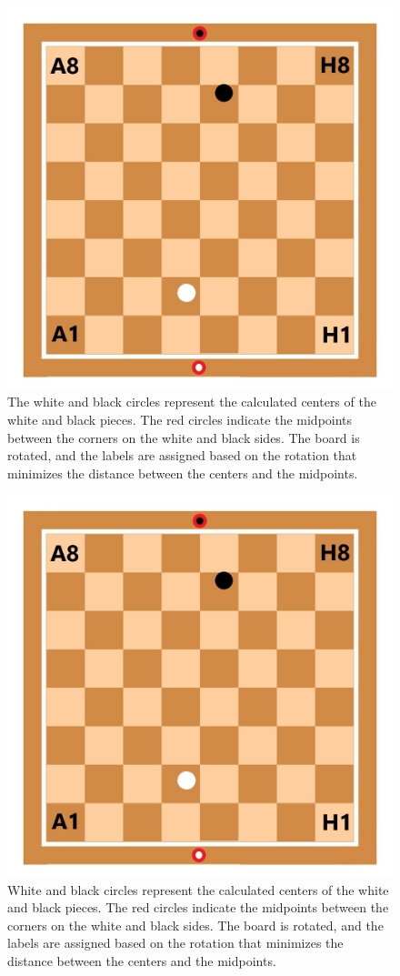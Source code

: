 \begin{figure}[h!]
\centering
\includegraphics[width=0.75\linewidth]{figures/methods/ml-models/label_assignment_board.jpg}
\caption[S]{The white and black circles represent the calculated centers of the white and black pieces. The red circles indicate the midpoints between the corners on the white and black sides. The board is rotated, and the labels are assigned based on the rotation that minimizes the distance between the centers and the midpoints.}
\label{fig:board_label_assignment}
\end{figure}
\begin{figure}[h!]
\centering
\includegraphics[width=0.75\linewidth]{figures/methods/ml-models/label_assignment_board.jpg}
\caption[S]{White and black circles represent the calculated centers of the white and black pieces. The red circles indicate the midpoints between the corners on the white and black sides. The board is rotated, and the labels are assigned based on the rotation that minimizes the distance between the centers and the midpoints.}
\label{fig:board_label_assignment}
\end{figure}

